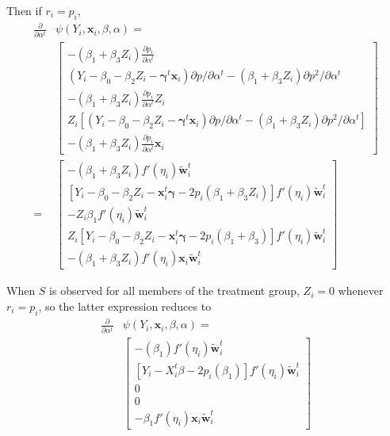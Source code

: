 \documentclass[11pt]{article} %
\begin{document}
Then if $r_i=p_i$,
\begin{align*}
  \frac{\partial}{\partial \alpha^t}&\psi(Y_i,\bm{x}_i,\beta,\alpha)=\\
  &\left[\begin{array}{c}
          -(\beta_1+\beta_3Z_i)\frac{\partial p_i}{\partial \alpha^t}\\
          (Y_i-\beta_0-\beta_2Z_i-\bm{\gamma}^t\bm{x}_{i})\partial p/\partial\alpha^t-(\beta_1+\beta_3Z_i)\partial p^2/\partial \alpha^t\\
          -(\beta_1+\beta_3Z_i)\frac{\partial p_i}{\partial \alpha^t}Z_i\\
          Z_i\left[(Y_i-\beta_0-\beta_2Z_i-\bm{\gamma}^t\bm{x}_{i})\partial p/\partial\alpha^t-(\beta_1+\beta_3Z_i)\partial p^2/\partial \alpha^t\right]\\
          -(\beta_1+\beta_3Z_i)\frac{\partial p_i}{\partial \alpha^t}\bm{x}_i
        \end{array}\right]\\
  =& \left[\begin{array}{c}
          -(\beta_1+\beta_3Z_i)f'(\eta_i)\bm{\tilde{w}}_i^t\\
          \left[Y_i-\beta_0-\beta_2Z_i-\bm{x}_i^t\bm{\gamma}-2p_i(\beta_1+\beta_3Z_i)\right]f'(\eta_i)\bm{\tilde{w}}_i^t\\
          -Z_i\beta_1f'(\eta_i)\bm{\tilde{w}}_i^t\\
          Z_i\left[Y_i-\beta_0-\beta_2Z_i-\bm{x}_i^t\bm{\gamma}-2p_i(\beta_1+\beta_3)\right]f'(\eta_i)\bm{\tilde{w}}_i^t\\
          -(\beta_1+\beta_3Z_i)f'(\eta_i)\bm{x}_i\bm{\tilde{w}}_i^t
    \end{array}\right]
\end{align*}

When $S$ is observed for all members of the treatment group, $Z_i=0$ whenever $r_i=p_i$, so the latter expression reduces to
\begin{align*}
  \frac{\partial}{\partial \alpha^t}&\psi(Y_i,\bm{x}_i,\beta,\alpha)=\\
  & \left[\begin{array}{c}
          -(\beta_1)f'(\eta_i)\bm{\tilde{w}}_i^t\\
          \left[Y_i-X_i^t\beta-2p_i(\beta_1)\right]f'(\eta_i)\bm{\tilde{w}}_i^t\\
          0\\
          0\\
          -\beta_1f'(\eta_i)\bm{x}_i\bm{\tilde{w}}_i^t
    \end{array}\right]
\end{align*}
\end{document}
